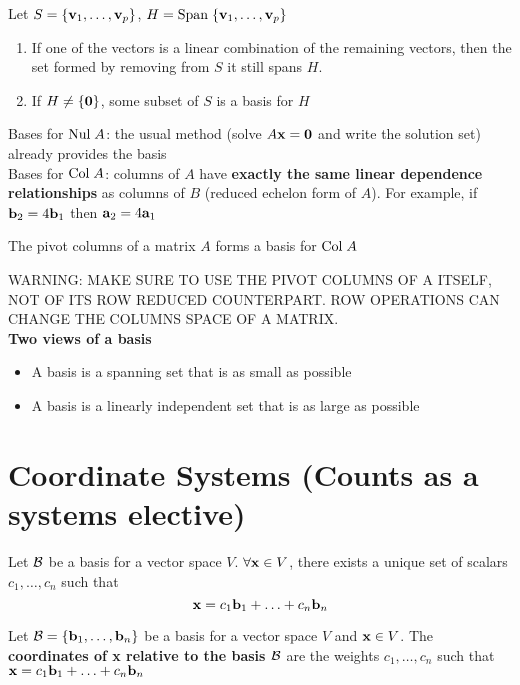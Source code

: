 \documentclass{report}
\begin{document}
\begin{theorem}
    Let $S = \{\mathbf{v}_1, \ldots, \mathbf{v}_p\}$, $H = \mathrm{Span}\; \{\mathbf{v}_1, \ldots, \mathbf{v}_p\}$
    \begin{enumerate}[label=\alph*.]
        \item If one of the vectors is a linear combination of the remaining vectors,
        then the set formed by removing from $S$ it still spans $H$.
        \item If $H \ne \{\mathbf{0}\}$, some subset of $S$ is a basis for $H$
    \end{enumerate}
\end{theorem}

Bases for $\mathrm{Nul}\; A$: the usual method (solve $A\mathbf{x} = \mathbf{0}$ and write the solution set) 
already provides the basis\\

Bases for $\mathrm{Col}\; A$: columns of $A$ have \textbf{exactly the same linear 
dependence relationships} as columns of $B$ (reduced echelon form of $A$).
For example, if $\mathbf{b}_2 = 4 \mathbf{b}_1$ then $\mathbf{a}_2 = 4 \mathbf{a}_1$

\begin{theorem}
    The pivot columns of a matrix $A$ forms a basis for $\mathrm{Col}\; A$
\end{theorem}

WARNING: MAKE SURE TO USE THE PIVOT COLUMNS OF A ITSELF, NOT OF ITS ROW 
REDUCED COUNTERPART. ROW OPERATIONS CAN CHANGE THE COLUMNS SPACE OF A MATRIX.
\\

\textbf{Two views of a basis}
\begin{itemize}
    \item A basis is a spanning set that is as small as possible
    \item A basis is a linearly independent set that is as large as possible
\end{itemize}

\section{Coordinate Systems (Counts as a systems elective)}
\begin{theorem}
    Let $\mathcal{B}$ be a basis for a vector space $V$. $\forall \mathbf{x} \in V$, there exists
    a unique set of scalars $c_1, \ldots, c_n$ such that \[
    \mathbf{x} = c_1\mathbf{b}_1 + \ldots + c_n\mathbf{b}_n
    \]
\end{theorem}

\begin{definition}
    Let $\mathcal{B} = \{\mathbf{b}_1, \ldots, \mathbf{b}_n\}$ be a basis for a vector space $V$ and $\mathbf{x} \in V$. 
    The \textbf{coordinates of x relative to the basis $\mathcal{B}$} are the weights $c_1, \ldots, c_n$ such that
    $\mathbf{x} = c_1\mathbf{b}_1 + \ldots + c_n\mathbf{b}_n $
\end{definition}
\end{document}
